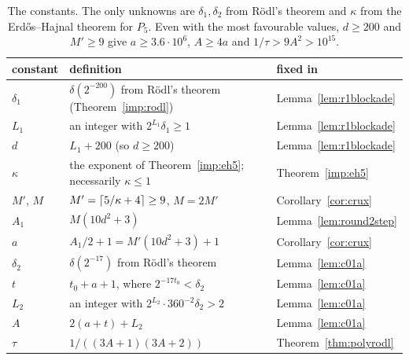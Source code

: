 \begin{table}[ht]
\centering
\small
\begin{tabularx}{\textwidth}{@{}l X l@{}}
\toprule
constant & definition & fixed in \\
\midrule
$\delta_1$ & $\delta(2^{-200})$ from R\"odl's theorem (Theorem~\ref{imp:rodl}) & Lemma~\ref{lem:r1blockade}\\
$L_1$ & an integer with $2^{L_1}\delta_1\ge1$ & Lemma~\ref{lem:r1blockade}\\
$d$ & $L_1+200$ (so $d\ge200$) & Lemma~\ref{lem:r1blockade}\\
$\kappa$ & the exponent of Theorem~\ref{imp:eh5}; necessarily $\kappa\le1$ & Theorem~\ref{imp:eh5}\\
$M'$, $M$ & $M'=\lceil 5/\kappa+4\rceil\ge9$, $M=2M'$ & Corollary~\ref{cor:crux}\\
$A_1$ & $M(10d^2+3)$ & Lemma~\ref{lem:round2step}\\
$a$ & $A_1/2+1=M'(10d^2+3)+1$ & Corollary~\ref{cor:crux}\\
$\delta_2$ & $\delta(2^{-17})$ from R\"odl's theorem & Lemma~\ref{lem:c01a}\\
$t$ & $t_0+a+1$, where $2^{-17t_0}<\delta_2$ & Lemma~\ref{lem:c01a}\\
$L_2$ & an integer with $2^{L_2}\cdot360^{-2}\delta_2>2$ & Lemma~\ref{lem:c01a}\\
$A$ & $2(a+t)+L_2$ & Lemma~\ref{lem:c01a}\\
$\tau$ & $1/((3A+1)(3A+2))$ & Theorem~\ref{thm:polyrodl}\\
\bottomrule
\end{tabularx}
\caption{The constants. The only unknowns are $\delta_1,\delta_2$ from R\"odl's theorem and $\kappa$ from
the Erd\H{o}s--Hajnal theorem for $P_5$. Even with the most favourable values, $d\ge200$ and $M'\ge9$ give
$a\ge3.6\cdot10^6$, $A\ge4a$ and $1/\tau>9A^2>10^{15}$.}
\label{tab:constants}
\end{table}
